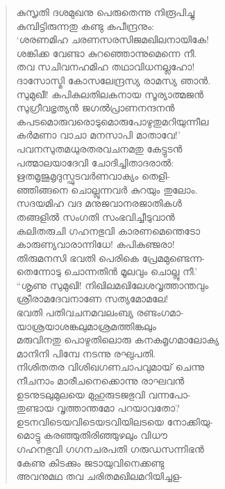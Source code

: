 \begin{verse}
കുസൃതി ദശമുഖനു പെരുതെന്നു നിരൂപിച്ചു\\
കുമ്പിട്ടിരുന്നതു കണ്ടു കപീന്ദ്രനും:\\
‘ശരണമിഹ ചരണസരസിജമഖിലനായികേ!\\
ശങ്കിക്ക വേണ്ടാ കുറഞ്ഞൊന്നുമെന്നെ നീ.\\
തവ സചിവനഹമിഹ തഥാവിധനല്ലഹോ!\\
ദാസോസ്മി കോസലേന്ദ്രസ്യ രാമസ്യ ഞാന്‍.\\
സുമുഖീ! കപികുലതിലകനായ സൂര്യാത്മജന്‍\\
സുഗ്രീവഭൃത്യന്‍ ജഗല്‍പ്രാണനന്ദനന്‍\\
കപടമൊരുവരൊടുമൊരുപോഴുതുമറിയുന്നീല\\
കര്‍മണാ വാചാ മനസാപി മാതാവേ!’\\
പവനസുതമധുരതരവചനമതു കേട്ടുടന്‍\\
പത്മാലയാദേവി ചോദിച്ചിതാദരാല്‍:\\
ഋതമൃജുമൃദുസ്ഫുടവര്‍ണവാക്യം തെളി-\\
ഞ്ഞിങ്ങനെ ചൊല്ലുന്നവര്‍ കുറയും തുലോം.\\
സദയമിഹ വദ മനുജവാനരജാതികള്‍\\
തങ്ങളില്‍ സംഗതി സംഭവിച്ചീടുവാന്‍\\
കലിതരുചി ഗഹനഭുവി കാരണമെന്തെടോ\\
കാരുണ്യവാരാന്നിധേ! കപികുഞ്ജരാ!\\
തിരുമനസി ഭവതി പെരികെ പ്രേമമുണ്ടെന്ന-\\
തെന്നോടു ചൊന്നതിന്‍ മൂലവും ചൊല്ലു നീ.’\\
“ശൃണു സുമുഖി! നിഖിലമഖിലേശവൃത്താന്തവും\\
ശ്രീരാമദേവനാണേ സത്യമോമലേ!\\
ഭവതി പതിവചനമവലംബ്യ രണ്ടംഗമാ-\\
യാശ്രയാശങ്കലുമാശ്രമത്തിങ്കലും\\
മരുവിനതു പൊഴുതിലൊരു കനകമൃഗമാലോക്യ\\
മാനിനി പിമ്പേ നടന്നു രഘുപതി.\\
നിശിതതര വിശിഖഗണചാപവുമായ് ചെന്നു\\
നീചനാം മാരീചനെക്കൊന്നു രാഘവന്‍\\
ഉടനുടലുമുലയെ മുഹുരുടജഭുവി വന്നപോ-\\
തുണ്ടായ വൃത്താന്തമോ പറയാവതോ?\\
ഉടനവിടെയവിടെയടവിയിലടയെ നോക്കിയു-\\
മൊട്ടു കരഞ്ഞുതിരിഞ്ഞുഴലും വിധൗ\\
ഗഹനഭുവി ഗഗനചരപതി ഗരുഡസന്നിഭന്‍\\
കേണു കിടക്കും ജടായുവിനെക്കണ്ടു\\
അവനുമഥ തവ ചരിതമഖിലമറിയിച്ചള-\\

\end{verse}
